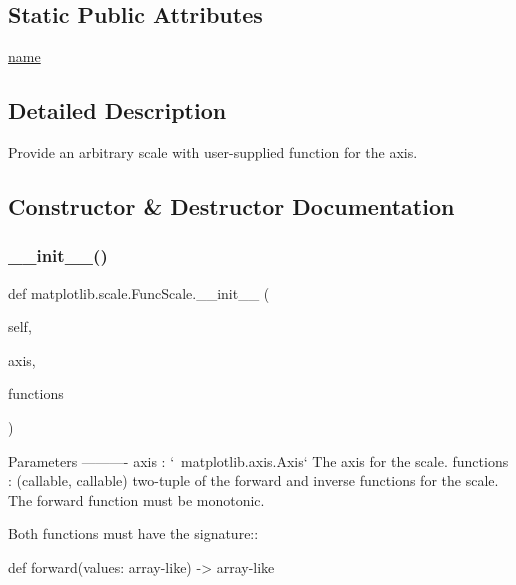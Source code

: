 \subsection*{Static Public Attributes}
\begin{DoxyCompactItemize}
\item 
\hyperlink{classmatplotlib_1_1scale_1_1FuncScale_a37288104c5c148f19d20359f716132e9}{name}
\end{DoxyCompactItemize}


\subsection{Detailed Description}
\begin{DoxyVerb}Provide an arbitrary scale with user-supplied function for the axis.
\end{DoxyVerb}
 

\subsection{Constructor \& Destructor Documentation}
\mbox{\label{classmatplotlib_1_1scale_1_1FuncScale_a8daf975115c648b910c747898ba9d464}} 
\subsubsection{\texorpdfstring{\+\_\+\+\_\+init\+\_\+\+\_\+()}{\_\_init\_\_()}}
{\footnotesize\ttfamily def matplotlib.\+scale.\+Func\+Scale.\+\_\+\+\_\+init\+\_\+\+\_\+ (\begin{DoxyParamCaption}\item[{}]{self,  }\item[{}]{axis,  }\item[{}]{functions }\end{DoxyParamCaption})}

\begin{DoxyVerb}Parameters
----------
axis : `~matplotlib.axis.Axis`
    The axis for the scale.
functions : (callable, callable)
    two-tuple of the forward and inverse functions for the scale.
    The forward function must be monotonic.

    Both functions must have the signature::

       def forward(values: array-like) -> array-like
\end{DoxyVerb}
 

